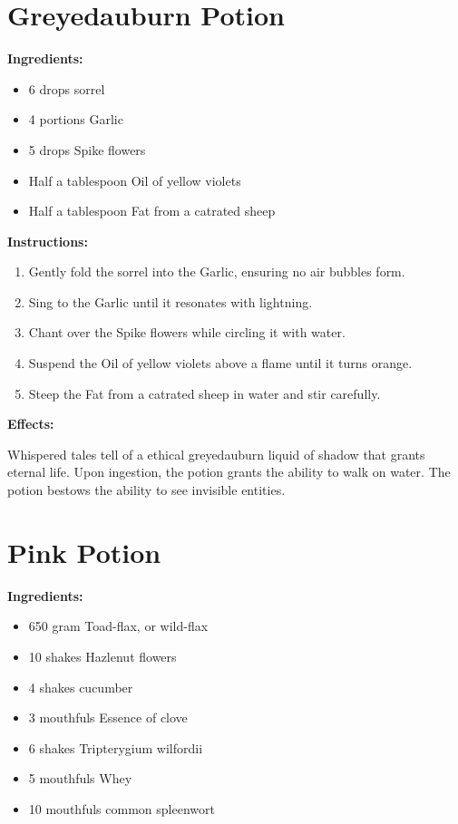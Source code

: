 \documentclass{article}
\begin{document}
\newpage
\section*{Greyedauburn Potion}

\textbf{Ingredients:}

\begin{itemize}
  \item 6 drops sorrel
  \item 4 portions Garlic
  \item 5 drops Spike flowers
  \item Half a tablespoon Oil of yellow violets
  \item Half a tablespoon Fat from a catrated sheep
\end{itemize}

\textbf{Instructions:}

\begin{enumerate}
  \item Gently fold the sorrel into the Garlic, ensuring no air bubbles form.
  \item Sing to the Garlic until it resonates with lightning.
  \item Chant over the Spike flowers while circling it with water.
  \item Suspend the Oil of yellow violets above a flame until it turns orange.
  \item Steep the Fat from a catrated sheep in water and stir carefully.
\end{enumerate}

\textbf{Effects:}

Whispered tales tell of a ethical greyedauburn liquid of shadow that grants eternal life. Upon ingestion, the potion grants the ability to walk on water. The potion bestows the ability to see invisible entities.

\newpage
\section*{Pink Potion}

\textbf{Ingredients:}

\begin{itemize}
  \item 650 gram Toad-flax, or wild-flax
  \item 10 shakes Hazlenut flowers
  \item 4 shakes cucumber
  \item 3 mouthfuls Essence of clove
  \item 6 shakes Tripterygium wilfordii
  \item 5 mouthfuls Whey
  \item 10 mouthfuls common spleenwort
\end{itemize}
\end{document}

